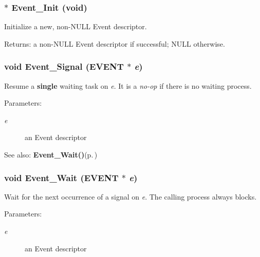 \subsubsection{$\ast$ Event\_\-Init (void)}\label{os_8h_852c4f8ed9198c7c996cc5e9ce7f1f2b}


Initialize a new, non-NULL Event descriptor. 

\begin{Desc}
\item[Returns:]a non-NULL Event descriptor if successful; NULL otherwise. \end{Desc}
\subsubsection{\setlength{\rightskip}{0pt plus 5cm}void Event\_\-Signal ({\bf EVENT} $\ast$ {\em e})}\label{os_8h_39210e081be158dab105c68cb85585cd}


Resume a {\bf single} waiting task on {\em e\/}. It is a {\em no-op\/} if there is no waiting process. 

\begin{Desc}
\item[Parameters:]
\begin{description}
\item[{\em e}]an Event descriptor\end{description}
\end{Desc}
\begin{Desc}
\item[See also:]{\bf Event\_\-Wait()}{\rm (p.\,\pageref{os_8c_e279428ffa0e59261a01899cea931503})} \end{Desc}
\subsubsection{\setlength{\rightskip}{0pt plus 5cm}void Event\_\-Wait ({\bf EVENT} $\ast$ {\em e})}\label{os_8h_e279428ffa0e59261a01899cea931503}


Wait for the next occurrence of a signal on {\em e\/}. The calling process always blocks. 

\begin{Desc}
\item[Parameters:]
\begin{description}
\item[{\em e}]an Event descriptor \end{description}
\end{Desc}
